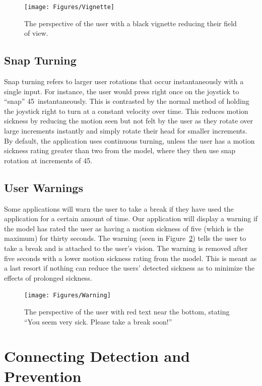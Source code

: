 \begin{figure}[h!]
    \texttt{[image: Figures/Vignette]}
    \centering
    \caption{The perspective of the user with a black vignette reducing their field of view.}
    \label{fig:vignetting_example}
\end{figure}

\subsection{Snap Turning}
\label{subsec:snap_turn}

Snap turning refers to larger user rotations that occur instantaneously with a single input.
For instance, the user would press right once on the joystick to ``snap'' 45\textdegree~instantaneously.
This is contrasted by the normal method of holding the joystick right to turn at a constant velocity over time.
This reduces motion sickness by reducing the motion seen but not felt by the user as they rotate over large increments instantly and simply rotate their head for smaller increments.
By default, the application uses continuous turning, unless the user has a motion sickness rating greater than two from the model, where they then use snap rotation at increments of 45\textdegree.

\subsection{User Warnings}
\label{subsec:user_warnings}

Some applications will warn the user to take a break if they have used the application for a certain amount of time.
Our application will display a warning if the model has rated the user as having a motion sickness of five (which is the maximum) for thirty seconds.
The warning (seen in Figure~\ref{fig:user_warning}) tells the user to take a break and is attached to the user's vision.
The warning is removed after five seconds with a lower motion sickness rating from the model.
This is meant as a last resort if nothing can reduce the users' detected sickness as to minimize the effects of prolonged sickness.

\begin{figure}[h!]
    \texttt{[image: Figures/Warning]}
    \centering
    \caption{The perspective of the user with red text near the bottom, stating ``You seem very sick. Please take a break soon!''}
    \label{fig:user_warning}
\end{figure}


\section{Connecting Detection and Prevention}
\label{sec:connecting}

